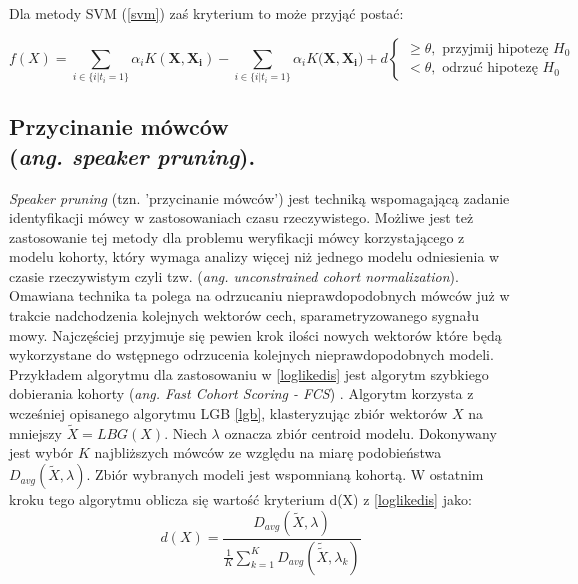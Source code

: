 Dla metody SVM (\ref{svm}) zaś kryterium to może przyjąć postać:

\begin{equation}
  \label{loglikesvm}
  f(X)= \sum_{i\in\{i|t_i = 1\}} \alpha_i K(\bm{X},\bm{X_i}) - \sum_{i\in\{i|t_i = 1\}}\alpha_i K(\bm{X},\bm{X_i)} + d
  \begin{cases}
    \ge \theta, \textrm{ przyjmij hipotezę } H_0 \\
    < \theta, \textrm{ odrzuć hipotezę } H_0
  \end{cases}
\end{equation}

\subsection{Przycinanie mówców\\ (\textit{ang. speaker pruning}).}

\textit{Speaker pruning} (tzn. 'przycinanie mówców') jest techniką wspomagającą zadanie identyfikacji mówcy w zastosowaniach czasu rzeczywistego. Możliwe jest też zastosowanie tej metody dla problemu weryfikacji mówcy korzystającego z modelu kohorty, który wymaga analizy więcej niż jednego modelu odniesienia w czasie rzeczywistym czyli tzw. (\textit{ang. unconstrained cohort normalization}). Omawiana technika ta polega na odrzucaniu nieprawdopodobnych mówców już w trakcie nadchodzenia kolejnych wektorów cech, sparametryzowanego sygnału mowy. Najczęściej przyjmuje się pewien krok ilości nowych wektorów które będą wykorzystane do wstępnego odrzucenia kolejnych nieprawdopodobnych modeli. Przykładem algorytmu dla zastosowaniu w \ref{loglikedis} jest algorytm szybkiego dobierania kohorty (\textit{ang. Fast Cohort Scoring - FCS}) \cite{finprunning}. Algorytm korzysta z wcześniej opisanego algorytmu LGB \ref{lgb}, klasteryzując zbiór wektorów $X$ na mniejszy $\tilde{X} = LBG(X)$. Niech $\lambda$ oznacza zbiór centroid modelu. Dokonywany jest wybór $K$ najbliższych mówców ze względu na miarę podobieństwa $D_{avg}(\tilde{X},\lambda)$. Zbiór wybranych modeli jest wspomnianą kohortą. W ostatnim kroku tego algorytmu oblicza się wartość kryterium d(X) z \ref{loglikedis} jako:
\begin{equation}
  d(X) = \frac{D_{avg}(\tilde{X},\lambda)}{\frac{1}{K}\sum_{k=1}^{K}D_{avg}(\tilde{\tilde{X}},\lambda_k)}
\end{equation}
